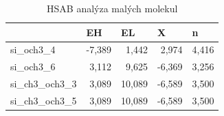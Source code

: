 \documentclass[
  digital, %
  table,   %
  lof,     %
  lot,     %
  oneside,
]{fithesis3}
\begin{document}
\begin{table}[htbp]
\caption{HSAB analýza malých molekul}
\begin{center}
\begin{tabular}{|l|r|r|r|r|}
\hline
 & \multicolumn{1}{l|}{EH} & \multicolumn{1}{l|}{EL} & \multicolumn{1}{l|}{X} & \multicolumn{1}{l|}{n} \\ \hline
si\_och3\_4 & -7,389 & 1,442 & 2,974 & 4,416 \\ \hline
si\_och3\_6 & 3,112 & 9,625 & -6,369 & 3,256 \\ \hline
si\_ch3\_och3\_3 & 3,089 & 10,089 & -6,589 & 3,500 \\ \hline
si\_ch3\_och3\_5 & 3,089 & 10,089 & -6,589 & 3,500 \\ \hline
\end{tabular}
\end{center}
\label{hsab_small}
\end{table}
\end{document}
